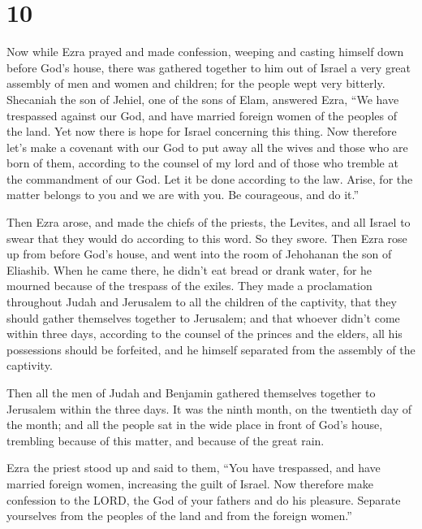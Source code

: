 \hypertarget{section-9}{%
\section{10}\label{section-9}}

 Now while Ezra prayed and made confession, weeping and
casting himself down before God's house, there was gathered together to
him out of Israel a very great assembly of men and women and children;
for the people wept very bitterly.  Shecaniah the son of
Jehiel, one of the sons of Elam, answered Ezra, ``We have trespassed
against our God, and have married foreign women of the peoples of the
land. Yet now there is hope for Israel concerning this thing.
 Now therefore let's make a covenant with our God to put
away all the wives and those who are born of them, according to the
counsel of my lord and of those who tremble at the commandment of our
God. Let it be done according to the law.  Arise, for the
matter belongs to you and we are with you. Be courageous, and do it.''

 Then Ezra arose, and made the chiefs of the priests, the
Levites, and all Israel to swear that they would do according to this
word. So they swore.  Then Ezra rose up from before God's
house, and went into the room of Jehohanan the son of Eliashib. When he
came there, he didn't eat bread or drank water, for he mourned because
of the trespass of the exiles.  They made a proclamation
throughout Judah and Jerusalem to all the children of the captivity,
that they should gather themselves together to Jerusalem; 
and that whoever didn't come within three days, according to the counsel
of the princes and the elders, all his possessions should be forfeited,
and he himself separated from the assembly of the captivity.

 Then all the men of Judah and Benjamin gathered themselves
together to Jerusalem within the three days. It was the ninth month, on
the twentieth day of the month; and all the people sat in the wide place
in front of God's house, trembling because of this matter, and because
of the great rain.

 Ezra the priest stood up and said to them, ``You have
trespassed, and have married foreign women, increasing the guilt of
Israel.  Now therefore make confession to the LORD, the God
of your fathers and do his pleasure. Separate yourselves from the
peoples of the land and from the foreign women.''

